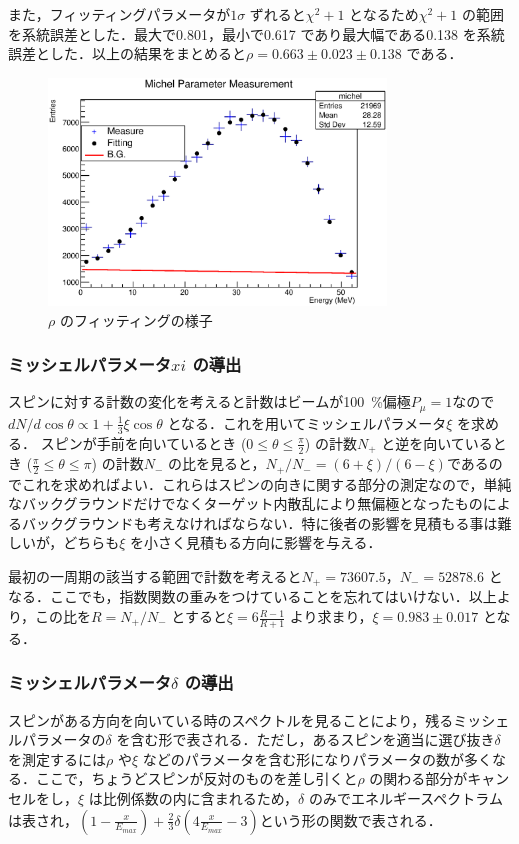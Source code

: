 また，フィッティングパラメータが$1\sigma$ ずれると$\chi^{2}+1$ となるため$\chi^{2} + 1$ の範囲を系統誤差とした．最大で0.801，最小で0.617 であり最大幅である0.138 を系統誤差とした．以上の結果をまとめると$\rho=0.663 \pm 0.023 \pm 0.138$ である．

\begin{figure}[bht]
\centering
\includegraphics[width=0.8\textwidth]{figure/hatano/rho.eps}
\caption{$\rho$ のフィッティングの様子}
\label{hatano_fig:rho}
\end{figure}

\subsubsection{ミッシェルパラメータ$xi$ の導出}
スピンに対する計数の変化を考えると計数はビームが100~\%偏極$P_{\mu} = 1$なので$dN / d \cos \theta \propto 1 + \frac{1}{3} \xi \cos \theta$ となる．これを用いてミッシェルパラメータ$\xi$ を求める．
スピンが手前を向いているとき ($0\leq\theta\leq\frac{\pi}{2}$) の計数$N_+$ と逆を向いているとき ($\frac{\pi}{2}\leq\theta\leq\pi$) の計数$N_-$ の比を見ると，$N_{+} / N_{-} =  (6 + \xi) / (6 -\xi)$であるのでこれを求めればよい．これらはスピンの向きに関する部分の測定なので，単純なバックグラウンドだけでなくターゲット内散乱により無偏極となったものによるバックグラウンドも考えなければならない．特に後者の影響を見積もる事は難しいが，どちらも$\xi$ を小さく見積もる方向に影響を与える．

最初の一周期の該当する範囲で計数を考えると$N_+=73607.5$，$N_-=52878.6$ となる．ここでも，指数関数の重みをつけていることを忘れてはいけない．以上より，この比を$R=N_{+} / N_{-}$ とすると$\xi=6\frac{R-1}{R+1}$ より求まり，$\xi=0.983\pm0.017$ となる．

\subsubsection{ミッシェルパラメータ$\delta$ の導出}
スピンがある方向を向いている時のスペクトルを見ることにより，残るミッシェルパラメータの$\delta$ を含む形で表される．ただし，あるスピンを適当に選び抜き$\delta$ を測定するには$\rho$ や$\xi$ などのパラメータを含む形になりパラメータの数が多くなる．ここで，ちょうどスピンが反対のものを差し引くと$\rho$ の関わる部分がキャンセルをし，$\xi$ は比例係数の内に含まれるため，$\delta$ のみでエネルギースペクトラムは表され，$(1-\frac{x}{E_{max}})+\frac{2}{3}\delta(4\frac{x}{E_{max}}-3)$という形の関数で表される．


